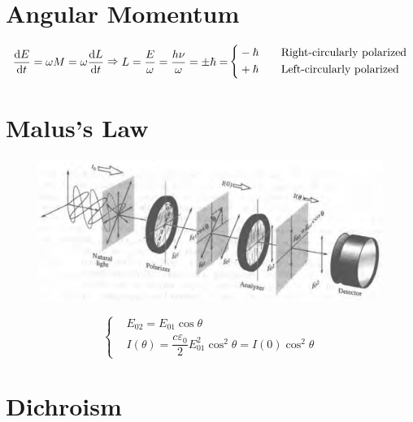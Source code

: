 \section{Angular Momentum}

\begin{equation*}
  \begin{aligned}
    \dfrac{\mathop{}\!\mathrm{d} E}{\mathop{}\!\mathrm{d} t} = \omega M = \omega \dfrac{\mathop{}\!\mathrm{d} L}{\mathop{}\!\mathrm{d} t}  
  \end{aligned}
  \Rightarrow 
  \begin{aligned}
    L = \dfrac{E}{\omega} = \dfrac{h \nu}{\omega} = \pm \hbar = 
  \end{aligned}
  \left\{
    \begin{aligned}
      & - \hbar \quad\quad \text{Right-circularly polarized} \\
      & + \hbar \quad\quad \text{Left-circularly polarized}
    \end{aligned}
  \right.
\end{equation*}

\section{Malus's Law}

\begin{figure}[H]
  \centering
  \includegraphics[width=0.7\linewidth]{figures/Malus}
  \label{fig:}
\end{figure}

\begin{equation*}
  \left\{
    \begin{aligned}
      & E_{02} = E_{01} \cos \theta \\
      & I \left( \theta \right) = \dfrac{c \varepsilon_0}{2} E_{01}^2 \cos^2 \theta = I \left( 0 \right) \cos^2 \theta
    \end{aligned}
  \right.
\end{equation*}

\section{Dichroism}


